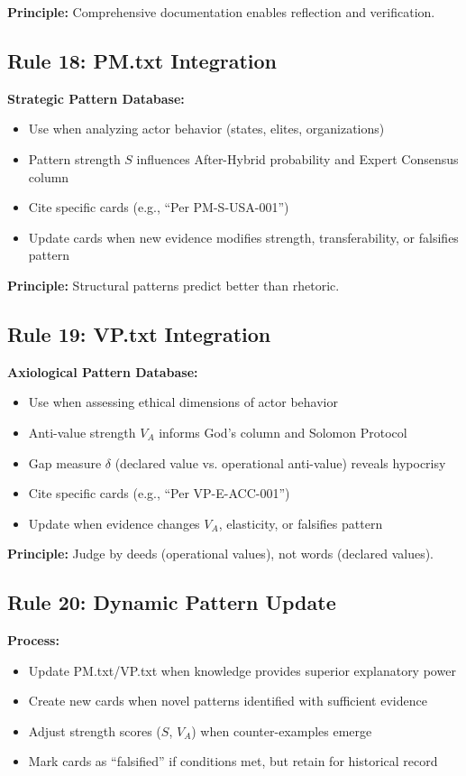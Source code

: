 \documentclass[11pt,a4paper]{article}
\theoremstyle{definition}
\theoremstyle{remark}
\begin{document}
\textbf{Principle:} Comprehensive documentation enables reflection and verification.

\subsection{Rule 18: PM.txt Integration}

\textbf{Strategic Pattern Database:}
\begin{itemize}
    \item Use when analyzing actor behavior (states, elites, organizations)
    \item Pattern strength $S$ influences After-Hybrid probability and Expert Consensus column
    \item Cite specific cards (e.g., ``Per PM-S-USA-001'')
    \item Update cards when new evidence modifies strength, transferability, or falsifies pattern
\end{itemize}

\textbf{Principle:} Structural patterns predict better than rhetoric.

\subsection{Rule 19: VP.txt Integration}

\textbf{Axiological Pattern Database:}
\begin{itemize}
    \item Use when assessing ethical dimensions of actor behavior
    \item Anti-value strength $V_A$ informs God's column and Solomon Protocol
    \item Gap measure $\delta$ (declared value vs. operational anti-value) reveals hypocrisy
    \item Cite specific cards (e.g., ``Per VP-E-ACC-001'')
    \item Update when evidence changes $V_A$, elasticity, or falsifies pattern
\end{itemize}

\textbf{Principle:} Judge by deeds (operational values), not words (declared values).

\subsection{Rule 20: Dynamic Pattern Update}

\textbf{Process:}
\begin{itemize}
    \item Update PM.txt/VP.txt when knowledge provides superior explanatory power
    \item Create new cards when novel patterns identified with sufficient evidence
    \item Adjust strength scores ($S$, $V_A$) when counter-examples emerge
    \item Mark cards as ``falsified'' if conditions met, but retain for historical record
\end{itemize}
\end{document}
